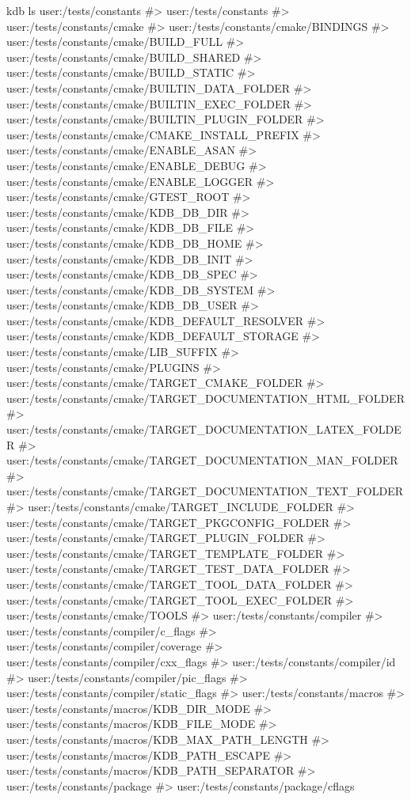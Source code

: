\begin{DoxyCode}
kdb ls user:/tests/constants
#> user:/tests/constants
#> user:/tests/constants/cmake
#> user:/tests/constants/cmake/BINDINGS
#> user:/tests/constants/cmake/BUILD\_FULL
#> user:/tests/constants/cmake/BUILD\_SHARED
#> user:/tests/constants/cmake/BUILD\_STATIC
#> user:/tests/constants/cmake/BUILTIN\_DATA\_FOLDER
#> user:/tests/constants/cmake/BUILTIN\_EXEC\_FOLDER
#> user:/tests/constants/cmake/BUILTIN\_PLUGIN\_FOLDER
#> user:/tests/constants/cmake/CMAKE\_INSTALL\_PREFIX
#> user:/tests/constants/cmake/ENABLE\_ASAN
#> user:/tests/constants/cmake/ENABLE\_DEBUG
#> user:/tests/constants/cmake/ENABLE\_LOGGER
#> user:/tests/constants/cmake/GTEST\_ROOT
#> user:/tests/constants/cmake/KDB\_DB\_DIR
#> user:/tests/constants/cmake/KDB\_DB\_FILE
#> user:/tests/constants/cmake/KDB\_DB\_HOME
#> user:/tests/constants/cmake/KDB\_DB\_INIT
#> user:/tests/constants/cmake/KDB\_DB\_SPEC
#> user:/tests/constants/cmake/KDB\_DB\_SYSTEM
#> user:/tests/constants/cmake/KDB\_DB\_USER
#> user:/tests/constants/cmake/KDB\_DEFAULT\_RESOLVER
#> user:/tests/constants/cmake/KDB\_DEFAULT\_STORAGE
#> user:/tests/constants/cmake/LIB\_SUFFIX
#> user:/tests/constants/cmake/PLUGINS
#> user:/tests/constants/cmake/TARGET\_CMAKE\_FOLDER
#> user:/tests/constants/cmake/TARGET\_DOCUMENTATION\_HTML\_FOLDER
#> user:/tests/constants/cmake/TARGET\_DOCUMENTATION\_LATEX\_FOLDER
#> user:/tests/constants/cmake/TARGET\_DOCUMENTATION\_MAN\_FOLDER
#> user:/tests/constants/cmake/TARGET\_DOCUMENTATION\_TEXT\_FOLDER
#> user:/tests/constants/cmake/TARGET\_INCLUDE\_FOLDER
#> user:/tests/constants/cmake/TARGET\_PKGCONFIG\_FOLDER
#> user:/tests/constants/cmake/TARGET\_PLUGIN\_FOLDER
#> user:/tests/constants/cmake/TARGET\_TEMPLATE\_FOLDER
#> user:/tests/constants/cmake/TARGET\_TEST\_DATA\_FOLDER
#> user:/tests/constants/cmake/TARGET\_TOOL\_DATA\_FOLDER
#> user:/tests/constants/cmake/TARGET\_TOOL\_EXEC\_FOLDER
#> user:/tests/constants/cmake/TOOLS
#> user:/tests/constants/compiler
#> user:/tests/constants/compiler/c\_flags
#> user:/tests/constants/compiler/coverage
#> user:/tests/constants/compiler/cxx\_flags
#> user:/tests/constants/compiler/id
#> user:/tests/constants/compiler/pic\_flags
#> user:/tests/constants/compiler/static\_flags
#> user:/tests/constants/macros
#> user:/tests/constants/macros/KDB\_DIR\_MODE
#> user:/tests/constants/macros/KDB\_FILE\_MODE
#> user:/tests/constants/macros/KDB\_MAX\_PATH\_LENGTH
#> user:/tests/constants/macros/KDB\_PATH\_ESCAPE
#> user:/tests/constants/macros/KDB\_PATH\_SEPARATOR
#> user:/tests/constants/package
#> user:/tests/constants/package/cflags

\end{DoxyCode}
